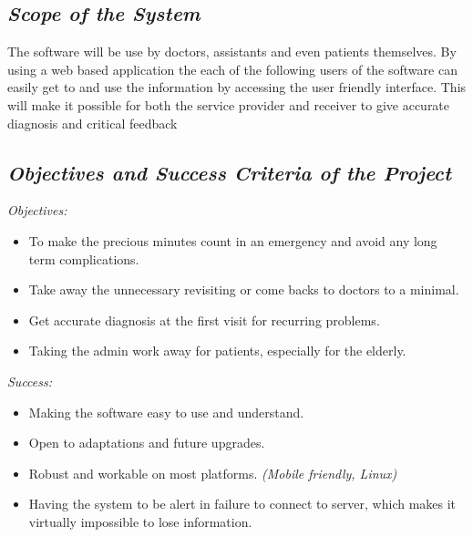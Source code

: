\documentclass[a4paper]{article}
\begin{document}
\subsection{\textit{Scope of the System}}

The software will be use by doctors, assistants and even patients themselves. By using a web based application the each of the following users of the software can easily get to and use the information by accessing the user friendly interface. This will make it possible for both the service provider and receiver to give accurate diagnosis and critical feedback

\subsection{\textit{Objectives and Success Criteria of the Project}}

\emph{Objectives:}

\begin{itemize} 

\item To make the precious minutes count in an emergency and avoid any long term complications.

\item Take away the unnecessary revisiting or come backs to doctors to a minimal.

\item Get accurate diagnosis at the first visit for recurring problems.

\item Taking the admin work away for patients, especially for the elderly.

\end{itemize}

\emph{Success:}

\begin{itemize} 

\item Making the software easy to use and understand.

\item Open to adaptations and future upgrades.

\item Robust and workable on most platforms. \emph{(Mobile friendly, Linux)}

\item Having the system to be alert in failure to connect to server, which makes it virtually impossible to lose information. 

\end{itemize}
		
\end{document}
